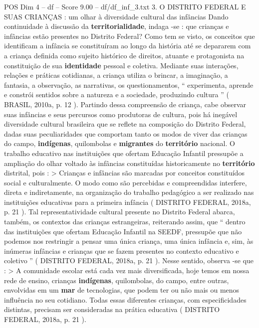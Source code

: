 \begin{textsample}{POS Dim 4 – df – Score 9.00 – df/df\_inf\_3.txt}  \label{ex:f4_pos_226}
3.
O DISTRITO FEDERAL E SUAS CRIANÇAS : um olhar à diversidade cultural das infâncias Dando continuidade à discussão da \textbf{territorialidade}, indaga -se : que crianças e infâncias estão presentes no Distrito Federal?
Como tem se visto, os conceitos que identificam a infância se constituíram ao longo da história até se depararem com a criança definida como sujeito histórico de direitos, atuante e protagonista na constituição de sua \textbf{identidade} pessoal e coletiva.
Mediante suas interações, relações e práticas cotidianas, a criança utiliza o brincar, a imaginação, a fantasia, a observação, as narrativas, os questionamentos, “ experimenta, aprende e constrói sentidos sobre a natureza e a sociedade, produzindo cultura ” ( BRASIL, 2010a, p. 12 ).
Partindo dessa compreensão de criança, cabe observar suas infâncias e seus percursos como produtoras de cultura, pois há inegável diversidade cultural brasileira que se reflete na composição do Distrito Federal, dadas suas peculiaridades que comportam tanto os modos de viver das crianças do campo, \textbf{indígenas}, quilombolas e \textbf{migrantes} do \textbf{território} nacional.
O trabalho educativo nas instituições que ofertam Educação Infantil pressupõe a ampliação do olhar voltado às infâncias constituídas historicamente no \textbf{território} distrital, pois : > Crianças e infâncias são marcadas por conceitos constituídos social e culturalmente.
O modo como são percebidas e compreendidas interfere, direta e indiretamente, na organização do trabalho pedagógico a ser realizado nas instituições educativas para a primeira infância ( DISTRITO FEDERAL, 2018a, p. 21 ).
Tal representatividade cultural presente no Distrito Federal abarca, também, os contextos das crianças estrangeiras, reiterando assim, que “ dentro das instituições que ofertam Educação Infantil na SEEDF, pressupõe que não podemos nos restringir a pensar uma única criança, uma única infância e, sim, às inúmeras infâncias e crianças que se fazem presentes no contexto educativo e coletivo ” ( DISTRITO FEDERAL, 2018a, p. 21 ).
Nesse sentido, observa -se que : > A comunidade escolar está cada vez mais diversificada, hoje temos em nossa rede de ensino, crianças \textbf{indígenas}, quilombolas, do campo, entre outras, envolvidas em um \textbf{mar} de tecnologias, que podem ter ou não mais ou menos influência no seu cotidiano.
Todas essas diferentes crianças, com especificidades distintas, precisam ser consideradas na prática educativa ( DISTRITO FEDERAL, 2018a, p. 21 ).

\end{textsample}
